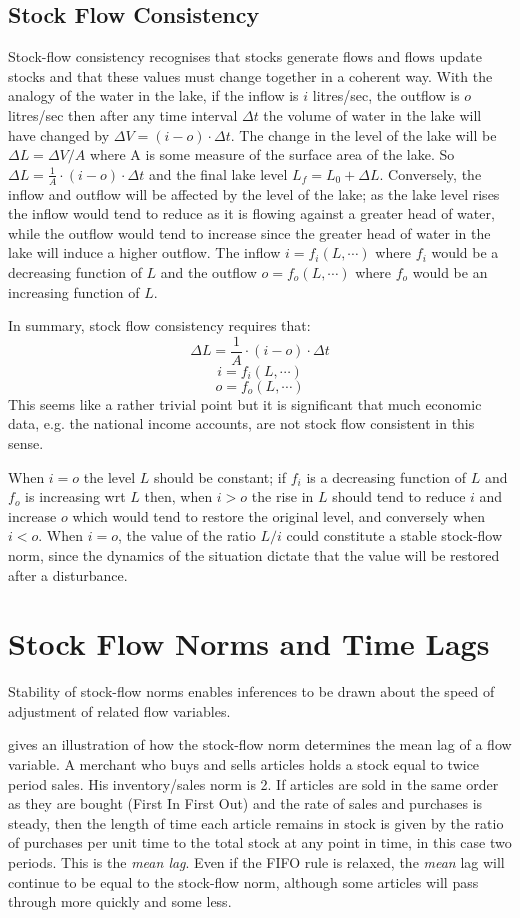 \documentclass[twoside,a4paper,11pt]{article}
\begin{document}
\subsection{Stock Flow Consistency}
Stock-flow consistency recognises that stocks generate flows and flows update stocks and that these values must change together in a coherent way. With the analogy of the water in the lake, if the inflow is $i$ litres/sec, the outflow is $o$ litres/sec then after any time interval $\Delta t$ the volume of water in the lake will have changed by $\Delta V = (i-o)\cdot\Delta t$. The change in the level of the lake will be $\Delta L = \Delta V / A$ where A is some measure of the surface area of the lake. So $\Delta L = \frac{1}{A}\cdot(i-o)\cdot\Delta t$ and the final lake level $L_{f}=L_{0}+\Delta L$. Conversely, the inflow and outflow will be affected by the level of the lake; as the lake level rises the inflow would tend to reduce as it is flowing against a greater head of water, while the outflow would tend to increase since the greater head of water in the lake will induce a higher outflow. The inflow $i = f_{i}(L,\cdots)$ where $f_{i}$ would be a decreasing function of $L$ and the outflow $o = f_{o}(L,\cdots)$ where $f_{o}$ would be an increasing function of $L$.

In summary, stock flow consistency requires that:\\
\[\Delta L = \frac{1}{A}\cdot(i-o)\cdot\Delta t\]
\[i = f_{i}(L,\cdots)\]
\[o = f_{o}(L,\cdots)\]
This seems like a rather trivial point but it is significant that much economic data, e.g. the national income accounts, are not stock flow consistent in this sense.

When $i=o$ the level $L$ should be constant; if $f_{i}$ is a decreasing function of $L$ and   $f_{o}$ is increasing wrt $L$ then, when $i > o$ the rise in $L$ should tend to reduce $i$ and increase $o$ which would tend to restore the original level, and conversely when $i < o$. When $i=o$, the value of the ratio $L/i$ could constitute a stable stock-flow norm, since the dynamics of the situation dictate that the value will be restored after a disturbance. 

\section{Stock Flow Norms and Time Lags}
Stability of stock-flow norms enables inferences to be drawn about the speed of adjustment of related flow variables.

\cite[p.36]{Godley1983} gives an illustration of how the stock-flow norm determines the mean lag of a flow variable. A merchant who buys and sells articles holds a stock equal to twice period sales. His inventory/sales norm is 2. If articles are sold in the  same order as they are bought (First In First Out) and the rate of sales and purchases is steady, then the length of time each article remains in stock is given by the ratio of purchases per unit time to the total stock at any point in time, in this case two periods. This is the \emph{mean lag}. Even if the FIFO rule is relaxed, the \emph{mean} lag will continue to be equal to the stock-flow norm, although some articles will pass through more quickly and some less.
\end{document}
